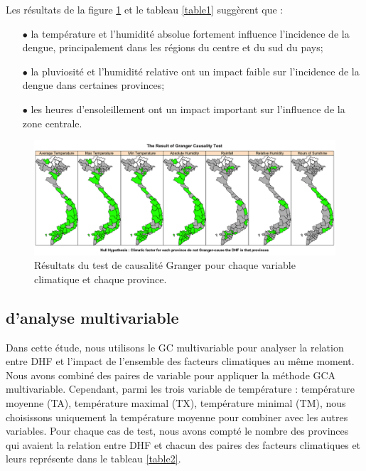 Les résultats de la figure \ref{Pic5_1}  et le tableau \ref{table1} suggèrent que : 

\begin{itemize} 
\item[$\bullet$] la température et l'humidité absolue fortement influence l'incidence de la dengue, principalement dans les régions du centre et du sud du pays;
\item[$\bullet$] la pluviosité et l'humidité relative ont un impact faible sur l'incidence de la dengue dans certaines provinces;
\item[$\bullet$] les heures d'ensoleillement ont un impact important sur l'influence de la zone centrale.
\end{itemize} 


\begin{figure}[h]
\includegraphics[width = \linewidth]{../figures/chap5/Pic5_1.png}
\caption{Résultats du test de causalité Granger pour chaque variable climatique et chaque province.}
\label{Pic5_1}	
\end{figure}

\subsection{\Rs d'analyse multivariable}
Dans cette étude, nous utilisons le GC multivariable pour analyser la relation entre DHF et l'impact de l'ensemble des facteurs climatiques au même moment. Nous avons combiné des paires de variable pour appliquer la méthode GCA multivariable. Cependant, parmi les trois variable de température : température moyenne (TA), température maximal (TX), température minimal (TM), nous choisissons uniquement la température moyenne pour combiner avec les autres variables. Pour chaque cas de test, nous avons compté le nombre des provinces qui avaient la relation entre DHF et chacun des paires des facteurs climatiques et leurs représente dans le tableau \ref{table2}. 

